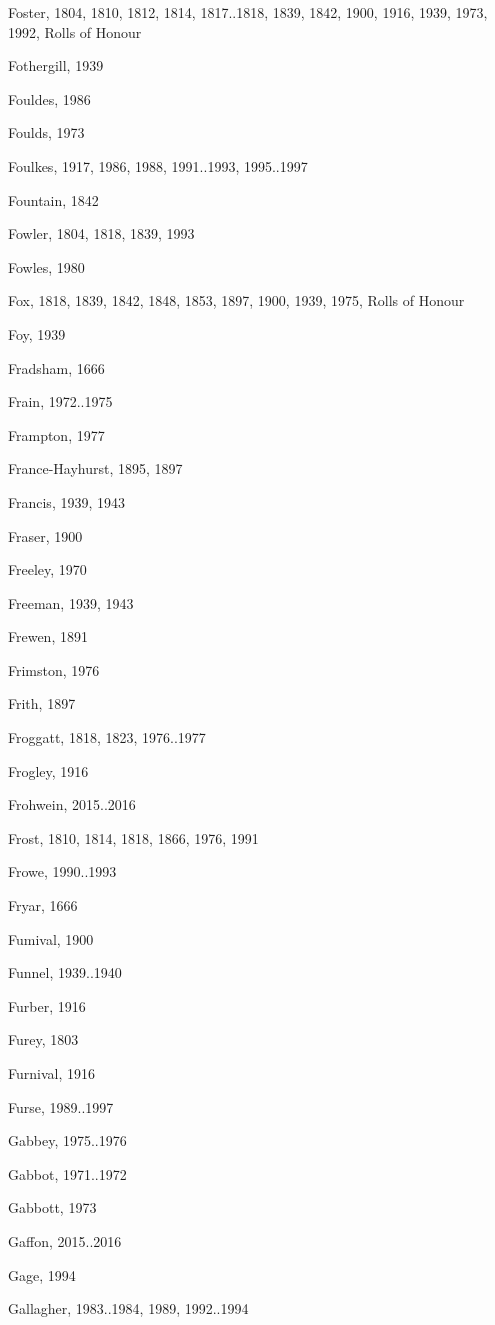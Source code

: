 \begin{theindex}
\item Foster, 1804, 1810, 1812, 1814, 1817..1818, 1839, 1842, 1900, 1916, 1939, 1973, 1992, Rolls of Honour
\item Fothergill, 1939
\item Fouldes, 1986
\item Foulds, 1973
\item Foulkes, 1917, 1986, 1988, 1991..1993, 1995..1997
\item Fountain, 1842
\item Fowler, 1804, 1818, 1839, 1993
\item Fowles, 1980
\item Fox, 1818, 1839, 1842, 1848, 1853, 1897, 1900, 1939, 1975, Rolls of Honour
\item Foy, 1939
\item Fradsham, 1666
\item Frain, 1972..1975
\item Frampton, 1977
\item France-Hayhurst, 1895, 1897
\item Francis, 1939, 1943
\item Fraser, 1900
\item Freeley, 1970
\item Freeman, 1939, 1943
\item Frewen, 1891
\item Frimston, 1976
\item Frith, 1897
\item Froggatt, 1818, 1823, 1976..1977
\item Frogley, 1916
\item Frohwein, 2015..2016
\item Frost, 1810, 1814, 1818, 1866, 1976, 1991
\item Frowe, 1990..1993
\item Fryar, 1666
\item Fumival, 1900
\item Funnel, 1939..1940
\item Furber, 1916
\item Furey, 1803
\item Furnival, 1916
\item Furse, 1989..1997
\item Gabbey, 1975..1976
\item Gabbot, 1971..1972
\item Gabbott, 1973
\item Gaffon, 2015..2016
\item Gage, 1994
\item Gallagher, 1983..1984, 1989, 1992..1994

\end{theindex}
